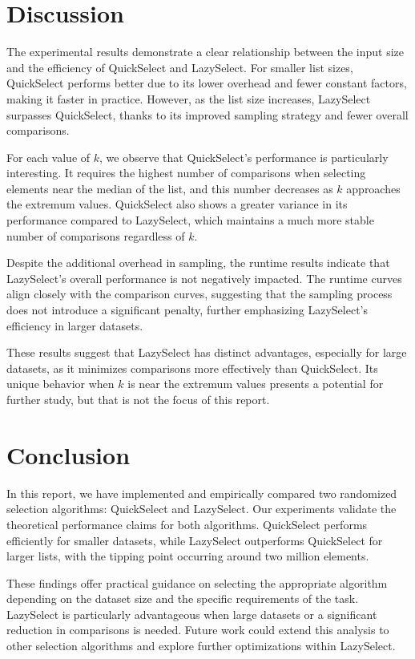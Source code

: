 \documentclass{article}
\begin{document}
\section{Discussion}

The experimental results demonstrate a clear relationship between the input size and the efficiency of QuickSelect and LazySelect. For smaller list sizes, QuickSelect performs better due to its lower overhead and fewer constant factors, making it faster in practice. However, as the list size increases, LazySelect surpasses QuickSelect, thanks to its improved sampling strategy and fewer overall comparisons.

For each value of \(k\), we observe that QuickSelect's performance is particularly interesting. It requires the highest number of comparisons when selecting elements near the median of the list, and this number decreases as \(k\) approaches the extremum values. QuickSelect also shows a greater variance in its performance compared to LazySelect, which maintains a much more stable number of comparisons regardless of \(k\).

Despite the additional overhead in sampling, the runtime results indicate that LazySelect's overall performance is not negatively impacted. The runtime curves align closely with the comparison curves, suggesting that the sampling process does not introduce a significant penalty, further emphasizing LazySelect’s efficiency in larger datasets.

These results suggest that LazySelect has distinct advantages, especially for large datasets, as it minimizes comparisons more effectively than QuickSelect. Its unique behavior when \(k\) is near the extremum values presents a potential for further study, but that is not the focus of this report.

\section{Conclusion}

In this report, we have implemented and empirically compared two randomized selection algorithms: QuickSelect and LazySelect. Our experiments validate the theoretical performance claims for both algorithms. QuickSelect performs efficiently for smaller datasets, while LazySelect outperforms QuickSelect for larger lists, with the tipping point occurring around two million elements.

These findings offer practical guidance on selecting the appropriate algorithm depending on the dataset size and the specific requirements of the task. LazySelect is particularly advantageous when large datasets or a significant reduction in comparisons is needed. Future work could extend this analysis to other selection algorithms and explore further optimizations within LazySelect.
\end{document}
